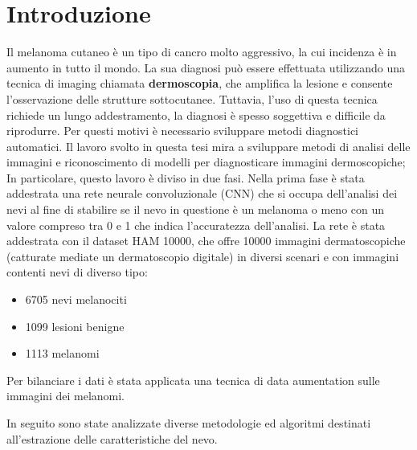 \chapter*{Introduzione}
\lhead{\bfseries }
\rhead{\thepage}
Il melanoma cutaneo è un tipo di cancro molto aggressivo, la cui incidenza è in aumento in tutto il mondo.
\newline
La sua diagnosi può essere effettuata utilizzando una tecnica di imaging chiamata \textbf{dermoscopia}, che amplifica la lesione e consente l'osservazione delle strutture sottocutanee. Tuttavia, l'uso di questa tecnica richiede un lungo addestramento, la diagnosi è spesso soggettiva e difficile da riprodurre. Per questi motivi è necessario sviluppare metodi diagnostici automatici.
\newline
Il lavoro svolto in questa tesi mira a sviluppare metodi di analisi delle immagini e riconoscimento di modelli per diagnosticare immagini dermoscopiche;
\newline
In particolare, questo lavoro è diviso in due fasi.
\newline
Nella prima fase è stata addestrata una rete neurale convoluzionale (CNN) che si occupa dell'analisi dei nevi al fine di stabilire se il nevo in questione è un melanoma o meno con un valore compreso tra 0 e 1 che indica l'accuratezza dell'analisi.
La rete è stata addestrata con il dataset HAM 10000, che offre 10000 immagini dermatoscopiche (catturate mediate un dermatoscopio digitale) in diversi scenari e con immagini contenti nevi di diverso tipo:
\begin{itemize}
\item 6705 nevi melanociti
\item 1099 lesioni benigne
\item 1113 melanomi
\end{itemize}
Per bilanciare i dati è stata applicata una tecnica di data aumentation sulle immagini dei melanomi.
\newline

In seguito sono state analizzate diverse metodologie ed algoritmi destinati all'estrazione delle caratteristiche del nevo.

